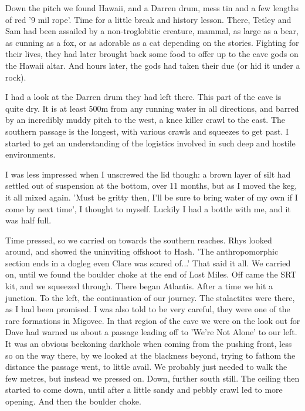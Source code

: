 Down the pitch we found Hawaii, and a Darren drum, mess tin and a few lengths of red '9 mil rope'. Time for a little break and history lesson. There, Tetley and Sam had been assailed by a non-troglobitic creature, mammal, as large as a bear, as cunning as a fox, or as adorable as a cat depending on the stories. Fighting for their lives, they had later brought back some food to offer up to the cave gods on the Hawaii altar. And hours later, the gods had taken their due (or hid it under a rock). 

I had a look at the Darren drum they had left there. This part of the cave is quite dry. It is at least 500m from any running water in all directions, and barred by an incredibly muddy pitch to the west, a knee killer crawl to the east. The southern passage is the longest, with various crawls and squeezes to get past. I started to get an understanding of the logistics involved in such deep and hostile environments.


I was less impressed when I unscrewed the lid though: a brown layer of silt had settled out of suspension at the bottom, over 11 months, but as I moved the keg, it all mixed again. 'Must be gritty then, I'll be sure to bring water of my own if I come by next time', I thought to myself. Luckily I had a bottle with me, and it was half full.

Time pressed, so we carried on towards the southern reaches. Rhys looked around, and showed the uninviting offshoot to Hash. 'The anthropomorphic section ends in a dogleg even Clare was scared of...' That said it all. We carried on, until we found the boulder choke at the end of Lost Miles. Off came the SRT kit, and we squeezed through. There began Atlantis. After a time we hit a junction. To the left, the continuation of our journey. The stalactites were there, as I had been promised. I was also told to be very careful, they were one of the rare formations in Migovec. In that region of the cave we were on the look out  for Dave had warned us about a passage leading off to 'We're Not Alone' to our left. It was an obvious beckoning darkhole when coming from the pushing front, less so on the way there, by we looked at the blackness beyond, trying to fathom the distance the passage went, to little avail. We probably just needed to walk the few metres, but instead we pressed on. Down, further south still. The ceiling then started to come down, until after a little sandy and pebbly crawl led to more opening. And then the boulder choke.


